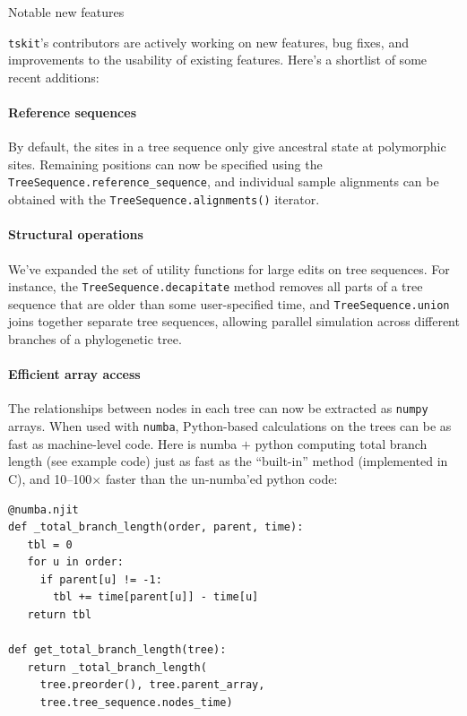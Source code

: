 \documentclass[landscape,a0paper,fontscale=0.4]{baposter}
\newcommand{\tskit}{{\texttt{tskit}}}
\begin{document}
\begin{poster}
\begin{posterbox}[name=operations,column=3,above=bottom,span=1]{Notable new features}

\tskit{}'s contributors are actively working on
    new features, bug fixes, and improvements to the usability of existing
    features. Here's a shortlist of some recent additions:

\paragraph{Reference sequences}
By default, the sites in a tree sequence only give ancestral state at
    polymorphic sites. Remaining positions can now be specified using the
    \texttt{TreeSequence.reference\_sequence}, and individual sample alignments can
    be obtained with the \texttt{TreeSequence.alignments()} iterator.

\paragraph{Structural operations}
We've expanded the set of utility functions for large edits on tree sequences.
    For instance, the \texttt{TreeSequence.decapitate} method removes all parts of a
    tree sequence that are older than some user-specified time,
    and \texttt{TreeSequence.union} joins together separate tree sequences,
    allowing parallel simulation across different branches of a phylogenetic tree.

\paragraph{Efficient array access}
The relationships between nodes in each tree can now be extracted as \texttt{numpy}
    arrays. When used with \texttt{numba},
    Python-based calculations on the trees can be as fast as
    machine-level code. Here is numba $+$ python computing total branch length
    (see example code)
    just as fast as the ``built-in'' method (implemented in C),
    and 10--100$\times$ faster than the un-numba'ed python code:

\begin{multicols}{2}
\begin{verbatim}
@numba.njit
def _total_branch_length(order, parent, time):
   tbl = 0
   for u in order:
     if parent[u] != -1:
       tbl += time[parent[u]] - time[u]
   return tbl

def get_total_branch_length(tree):
   return _total_branch_length(
     tree.preorder(), tree.parent_array,
     tree.tree_sequence.nodes_time)
\end{verbatim}


\end{multicols}
\end{posterbox}
\end{poster}
\end{document}
